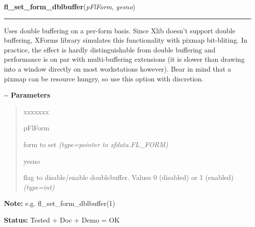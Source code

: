 \hspace{.8\funcindent}\begin{boxedminipage}{\funcwidth}

    \raggedright \textbf{fl\_set\_form\_dblbuffer}(\textit{pFlForm}, \textit{yesno})

    \vspace{-1.5ex}

    \rule{\textwidth}{0.5\fboxrule}
\setlength{\parskip}{2ex}

Uses double buffering on a per-form basis. Since Xlib doesn't support
double buffering, XForms library simulates this functionality with pixmap
bit-bliting. In practice, the effect is hardly distinguishable from double
buffering and performance is on par with multi-buffering extensions (it is
slower than drawing into a window directly on most workstations however).
Bear in mind that a pixmap can be resource hungry, so use this option with
discretion.

-{}-
\setlength{\parskip}{1ex}
      \textbf{Parameters}
      \vspace{-1ex}

      \begin{quote}
        \begin{Ventry}{xxxxxxx}

          \item[pFlForm]


form to set
            {\it (type=pointer to xfdata.FL\_FORM)}

          \item[yesno]


flag to disable/enable doublebuffer. Values 0 (disabled) or 1 (enabled)
            {\it (type=int)}

        \end{Ventry}

      \end{quote}

\textbf{Note:} 
e.g. fl\_set\_form\_dblbuffer(1)


\textbf{Status:} 
Tested + Doc + Demo = OK


    \end{boxedminipage}

    \label{xformslib:flbasic:fl_prepare_form_window}

    \vspace{0.5ex}

